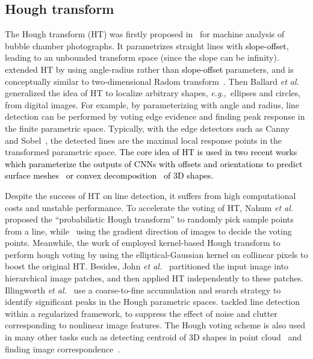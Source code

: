 \documentclass[10pt,journal,cspaper,compsoc]{IEEEtran}
\newcommand{\revise}[1]{{\textcolor{black}{#1}}}
\def\etal{\emph{et al.~}}
\def\eg{\emph{e.g.,~}}
\begin{document}
\subsection{Hough transform}
The Hough transform (HT) was firstly proposed in~\cite{hough1962method} for machine analysis of bubble chamber photographs.
%
It parametrizes straight lines with \revise{slope-offset}, leading to an unbounded transform space (since the slope can be infinity).
%
\cite{duda1971use} extended HT by using angle-radius rather than \revise{slope-offset}
parameters, and is conceptually similar to two-dimensional Radom transform~\cite{radon20051}.
%
Then Ballard \etal \cite{ballard1981generating} generalized the idea of HT to localize arbitrary shapes, \eg ellipses and circles, from digital images.
%
For example, by parameterizing with angle and radius, line detection can be performed by voting edge evidence and finding peak response in the finite parametric space.
%
Typically, with the edge detectors such as Canny~\cite{canny1986computational} and Sobel~\cite{sobel},
the detected lines are the maximal local response points in the transformed parametric space.
%
\revise{The core idea of HT is used in two recent
works which
parameterize the outputs of CNNs with offsets and orientations
to predict surface meshes~\cite{chen2020bsp} or
convex decomposition~\cite{deng2020cvxnet} of 3D shapes.}

Despite the success of HT on line detection, it suffers from high computational costs and unstable performance.
%
To accelerate the voting of HT, Nahum \etal \cite{kiryati1991probabilistic} 
proposed the ``probabilistic Hough transform'' to randomly pick 
sample points from a line, 
while~\cite{finding1976} using the gradient direction of images to decide 
the voting points.
%
Meanwhile, the work of \cite{fernandes2008real,limberger2015real} 
employed kernel-based Hough transform to perform hough voting by using 
the elliptical-Gaussian kernel on collinear pixels to boost the original HT.
%
Besides, John \etal \cite{princen1990hierarchical,yacoub1995hierarchical} partitioned the input image into
hierarchical image patches, and then applied HT independently to these patches.
%
Illingworth \etal \cite{illingworth1987adaptive} use a coarse-to-fine accumulation and search
strategy to identify significant peaks in the Hough parametric spaces.
%
\cite{aggarwal2006line} tackled line detection within a
regularized framework, to suppress the effect of noise and clutter corresponding to nonlinear image features.
%
The Hough voting scheme is also used in many other tasks such as
detecting centroid of 3D shapes in point cloud~\cite{qi2019deep} and finding image correspondence~\cite{min2019hyperpixel}.
\end{document}
